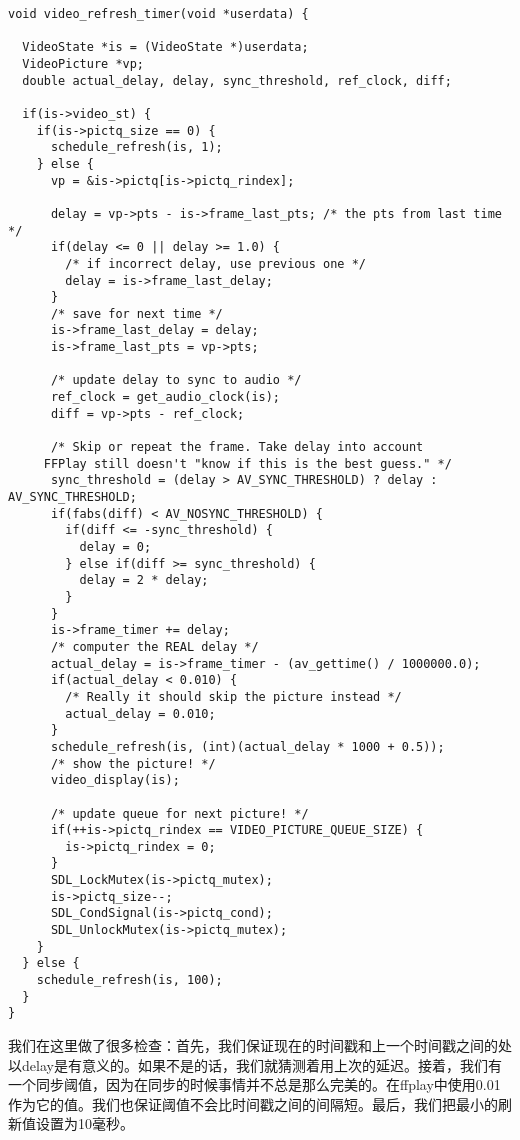 \begin{lstlisting}
void video_refresh_timer(void *userdata) {

  VideoState *is = (VideoState *)userdata;
  VideoPicture *vp;
  double actual_delay, delay, sync_threshold, ref_clock, diff;

  if(is->video_st) {
    if(is->pictq_size == 0) {
      schedule_refresh(is, 1);
    } else {
      vp = &is->pictq[is->pictq_rindex];

      delay = vp->pts - is->frame_last_pts; /* the pts from last time */
      if(delay <= 0 || delay >= 1.0) {
		/* if incorrect delay, use previous one */
		delay = is->frame_last_delay;
      }
      /* save for next time */
      is->frame_last_delay = delay;
      is->frame_last_pts = vp->pts;

      /* update delay to sync to audio */
      ref_clock = get_audio_clock(is);
      diff = vp->pts - ref_clock;

      /* Skip or repeat the frame. Take delay into account
     FFPlay still doesn't "know if this is the best guess." */
      sync_threshold = (delay > AV_SYNC_THRESHOLD) ? delay : AV_SYNC_THRESHOLD;
      if(fabs(diff) < AV_NOSYNC_THRESHOLD) {
		if(diff <= -sync_threshold) {
		  delay = 0;
		} else if(diff >= sync_threshold) {
		  delay = 2 * delay;
		}
      }
      is->frame_timer += delay;
      /* computer the REAL delay */
      actual_delay = is->frame_timer - (av_gettime() / 1000000.0);
      if(actual_delay < 0.010) {
		/* Really it should skip the picture instead */
		actual_delay = 0.010;
      }
      schedule_refresh(is, (int)(actual_delay * 1000 + 0.5));
      /* show the picture! */
      video_display(is);

      /* update queue for next picture! */
      if(++is->pictq_rindex == VIDEO_PICTURE_QUEUE_SIZE) {
        is->pictq_rindex = 0;
      }
      SDL_LockMutex(is->pictq_mutex);
      is->pictq_size--;
      SDL_CondSignal(is->pictq_cond);
      SDL_UnlockMutex(is->pictq_mutex);
    }
  } else {
    schedule_refresh(is, 100);
  }
}
\end{lstlisting}

我们在这里做了很多检查：首先，我们保证现在的时间戳和上一个时间戳之间的处以delay是有意义的。如果不是的话，我们就猜测着用上次的延迟。接着，我们有一个同步阈值，因为在同步的时候事情并不总是那么完美的。在ffplay中使用0.01 作为它的值。我们也保证阈值不会比时间戳之间的间隔短。最后，我们把最小的刷新值设置为10毫秒。


